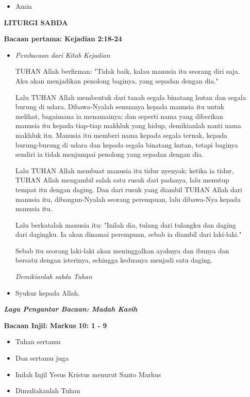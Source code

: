 \documentclass[a5paper,headsepline,titlepage,11pt,nnormalheadings]{scrartcl}
\makeatletter
\newcommand{\judul}[1]{%
  {\parindent \z@ \centering \normalfont
    \interlinepenalty\@M \Large \bfseries #1\par\nobreak \vskip 20\p@ }}
\newcommand{\subjudul}[1]{%
  {\parindent \z@ \normalfont
    \interlinepenalty\@M \bfseries #1\par\nobreak \vskip 20\p@ }}
\newcommand{\lagu}[1]{%
  {\parindent \z@ \normalfont
    \interlinepenalty\@M \bfseries \emph{#1}\par\nobreak \vskip 20\p@ }}
\newcommand{\BU}[1]{\begin{itemize} \item[U:] #1 \end{itemize}}
\newcommand{\BP}[1]{\begin{itemize} \item[P:] #1 \end{itemize}}
\newcommand{\laguantarbacaan}{Madah Kasih }
\makeatother
\begin{document}
\BU{Amin}

\judul{LITURGI SABDA}

\subjudul{Bacaan pertama: Kejadian 2:18-24}

\BP{\emph{Pembacaan dari Kitab Kejadian}

TUHAN Allah berfirman: "Tidak baik, kalau manusia itu seorang diri saja. Aku akan menjadikan penolong baginya, yang sepadan dengan dia."

Lalu TUHAN Allah membentuk dari tanah segala binatang hutan dan segala burung di udara. Dibawa-Nyalah semuanya kepada manusia itu untuk melihat, bagaimana ia menamainya; dan seperti nama yang diberikan manusia itu kepada tiap-tiap makhluk yang hidup, demikianlah nanti nama makhluk itu.
Manusia itu memberi nama kepada segala ternak, kepada burung-burung di udara dan kepada segala binatang hutan, tetapi baginya sendiri ia tidak menjumpai penolong yang sepadan dengan dia.

Lalu TUHAN Allah membuat manusia itu tidur nyenyak; ketika ia tidur, TUHAN Allah mengambil salah satu rusuk dari padanya, lalu menutup tempat itu dengan daging.
Dan dari rusuk yang diambil TUHAN Allah dari manusia itu, dibangun-Nyalah seorang perempuan, lalu dibawa-Nya kepada manusia itu.

Lalu berkatalah manusia itu: "Inilah dia, tulang dari tulangku dan daging dari dagingku. Ia akan dinamai perempuan, sebab ia diambil dari laki-laki."

Sebab itu seorang laki-laki akan meninggalkan ayahnya dan ibunya dan bersatu dengan isterinya, sehingga keduanya menjadi satu daging.

\emph{Demikianlah sabda Tuhan}
}

\BU{Syukur kepada Allah.}

\lagu{Lagu Pengantar Bacaan: \laguantarbacaan}


\subjudul{Bacaan Injil: Markus 10: 1 - 9}

\BP{Tuhan sertamu}

\BU{Dan sertamu juga}

\BP{Inilah Injil Yesus Kristus menurut Santo Markus}

\BU{Dimuliakanlah Tuhan}
\end{document}

